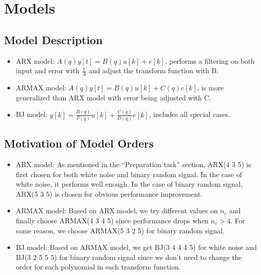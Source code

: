 \documentclass[10pt,a4paper]{article}
\begin{document}
\section{Models}
\subsection{Model Description}
\begin{itemize}
	\item ARX model: $A(q) y[t] = B(q) u[k] + e[k]$, performs a filtering on both input and error with $\frac{1}{A}$ and adjust the transform function with B.
    \item ARMAX model: $A(q) y[t] = B(q) u[k] + C(q) e[k]$, is more generalized than ARX model with error being adjusted with C.
    \item BJ model: $y[k] = \frac{B(q)}{F(q)} u[k] + \frac{C(q)}{D(q)} e[k]$, includes all special cases.
\end{itemize}
\subsection{Motivation of Model Orders}
\begin{itemize}
\item ARX model: As mentioned in the ``Preparation task'' section, ARX(4 3 5) is first chosen for both white noise and binary random signal. In the case of white noise, it performs well enough. In the case of binary random signal, ARX(5 3 5) is chosen for obvious performance improvement.
\item ARMAX model: Based on ARX model, we try different values on $n_{c}$ and finally choose ARMAX(4 3 4 5) since performance drops when $n_{c} > 4$. For same reason, we choose ARMAX(5 3 2 5) for binary random signal.
\item BJ model: Based on ARMAX model, we get BJ(3 4 4 4 5) for white noise and BJ(3 2 5 5 5) for binary random signal since we don't need to change the order for each polynomial in each transform function.
\end{itemize}
\end{document}
